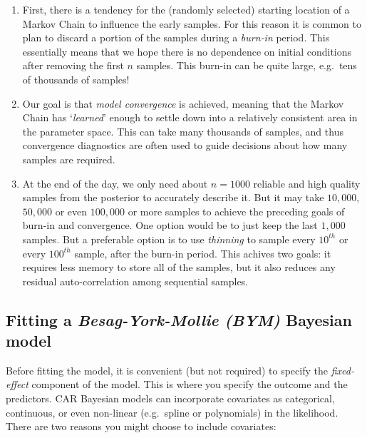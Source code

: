 \documentclass[
]{book}
\providecommand{\tightlist}{%
  \setlength{\itemsep}{0pt}\setlength{\parskip}{0pt}}
\begin{document}
\begin{enumerate}
\def\labelenumi{\arabic{enumi}.}
\tightlist
\item
  First, there is a tendency for the (randomly selected) starting location of a Markov Chain to influence the early samples. For this reason it is common to plan to discard a portion of the samples during a \emph{burn-in} period. This essentially means that we hope there is no dependence on initial conditions after removing the first \(n\) samples. This burn-in can be quite large, e.g.~tens of thousands of samples!
\item
  Our goal is that \emph{model convergence} is achieved, meaning that the Markov Chain has `\emph{learned}' enough to settle down into a relatively consistent area in the parameter space. This can take many thousands of samples, and thus convergence diagnostics are often used to guide decisions about how many samples are required.
\item
  At the end of the day, we only need about \(n=1000\) reliable and high quality samples from the posterior to accurately describe it. But it may take \(10,000\), \(50,000\) or even \(100,000\) or more samples to achieve the preceding goals of burn-in and convergence. One option would be to just keep the last \(1,000\) samples. But a preferable option is to use \emph{thinning} to sample every \(10^{th}\) or every \(100^{th}\) sample, after the burn-in period. This achives two goals: it requires less memory to store all of the samples, but it also reduces any residual auto-correlation among sequential samples.
\end{enumerate}

\hypertarget{fitting-a-besag-york-mollie-bym-bayesian-model}{%
\subsection{\texorpdfstring{Fitting a \emph{Besag-York-Mollie (BYM)} Bayesian model}{Fitting a Besag-York-Mollie (BYM) Bayesian model}}\label{fitting-a-besag-york-mollie-bym-bayesian-model}}

Before fitting the model, it is convenient (but not required) to specify the \emph{fixed-effect} component of the model. This is where you specify the outcome and the predictors. CAR Bayesian models can incorporate covariates as categorical, continuous, or even non-linear (e.g.~spline or polynomials) in the likelihood. There are two reasons you might choose to include covariates:
\end{document}
